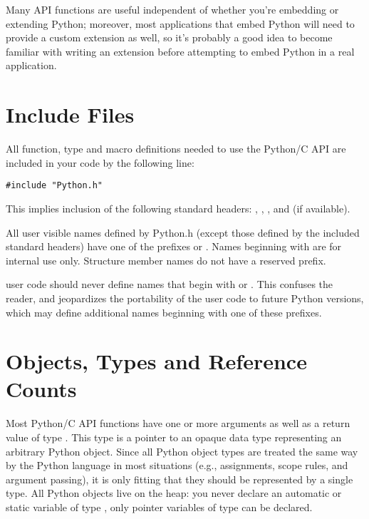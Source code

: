 \documentclass{manual}
\begin{document}
Many API functions are useful independent of whether you're embedding 
or extending Python; moreover, most applications that embed Python 
will need to provide a custom extension as well, so it's probably a 
good idea to become familiar with writing an extension before 
attempting to embed Python in a real application.


\section{Include Files \label{includes}}

All function, type and macro definitions needed to use the Python/C
API are included in your code by the following line:

\begin{verbatim}
#include "Python.h"
\end{verbatim}

This implies inclusion of the following standard headers:
, , , and
 (if available).

All user visible names defined by Python.h (except those defined by
the included standard headers) have one of the prefixes  or
.  Names beginning with  are for internal use
only.  Structure member names do not have a reserved prefix.

 user code should never define names that begin
with  or .  This confuses the reader, and
jeopardizes the portability of the user code to future Python
versions, which may define additional names beginning with one of
these prefixes.


\section{Objects, Types and Reference Counts \label{objects}}

Most Python/C API functions have one or more arguments as well as a
return value of type .  This type is a pointer
to an opaque data type representing an arbitrary Python
object.  Since all Python object types are treated the same way by the
Python language in most situations (e.g., assignments, scope rules,
and argument passing), it is only fitting that they should be
represented by a single \C{} type.  All Python objects live on the heap:
you never declare an automatic or static variable of type
, only pointer variables of type  can 
be declared.
\end{document}
